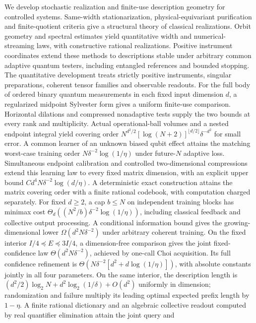 \documentclass[11pt]{amsart}
\numberwithin{equation}{section}
\theoremstyle{definition}\newtheorem{definition}[theorem]{Definition}
\theoremstyle{remark}\newtheorem{remark}[theorem]{Remark}
\begin{document}
We develop stochastic realization and finite-use description geometry
for controlled systems. Same-width stationarization, physical-equivariant
purification and finite-quotient criteria give a structural theory of
classical realizations. Orbit geometry and spectral estimates yield
quantitative width and numerical-streaming laws, with constructive
rational realizations. Positive instrument coordinates extend these
methods to descriptions stable under arbitrary common adaptive quantum
testers, including entangled references and bounded stopping.
The quantitative development treats strictly positive instruments,
singular preparations, coherent tensor families and observable readouts.
For the full body of ordered binary quantum measurements in each fixed
input dimension $d$, a regularized midpoint Sylvester form gives a
uniform finite-use comparison. Horizontal dilations and compressed
nonadaptive tests supply the two bounds at every rank and multiplicity.
Actual operational-ball volumes and a nested endpoint integral yield
covering order
\mbox{$N^{d^2/2}[\log(N+2)]^{\lfloor d/2\rfloor}\delta^{-d^2}$}
for small error. A common learner of an unknown biased qubit effect
attains the matching worst-case training order
$N\delta^{-2}\log(1/\eta)$ under future-$N$ adaptive loss.
Simultaneous endpoint calibration and controlled two-dimensional
compressions extend this learning law to every fixed matrix dimension,
with an explicit upper bound $Cd^4N\delta^{-2}\log(d/\eta)$.
A deterministic exact construction attains the matrix covering order
with a finite rational codebook, with computation charged separately.
For fixed $d\ge2$, a cap $b\le N$ on independent training blocks
has minimax cost $\Theta_d((N^2/b)\delta^{-2}\log(1/\eta))$,
including classical feedback and collective output processing.
A conditional information bound gives the growing-dimensional lower
$\Omega(d^2N\delta^{-2})$ under arbitrary coherent training.
On the fixed interior $I/4\preceq E\preceq3I/4$, a dimension-free
comparison gives the joint fixed-confidence law
$\Theta(d^2N\delta^{-2})$, achieved by one-call Choi acquisition.
Its full confidence refinement is
\mbox{$\Theta(N\delta^{-2}[d^2+d\log(1/\eta)])$}, with absolute
constants jointly in all four parameters.
On the same interior, the description length is
$(d^2/2)\log_2N+d^2\log_2(1/\delta)+O(d^2)$ uniformly in
dimension; randomization and failure multiply its leading optimal
expected prefix length by $1-\eta$.
A finite rational dictionary and an algebraic collective readout
computed by real quantifier elimination attain the joint query and
\end{document}
